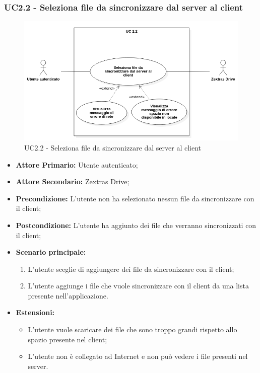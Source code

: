 \subsubsection{UC2.2 - Seleziona file da sincronizzare dal server al client}
\begin{figure}[H]
    \centering
    \includegraphics[scale = 0.6]{components/img/UC2_2.png}
    \caption{UC2.2 - Seleziona file da sincronizzare dal server al client}
\end{figure}
\begin{itemize}
\item \textbf{Attore Primario:} Utente autenticato;
\item \textbf{Attore Secondario:} Zextras Drive;
\item \textbf{Precondizione:} L'utente non ha selezionato nessun file da sincronizzare con il client;
\item \textbf{Postcondizione:} L'utente ha aggiunto dei file che verranno sincronizzati con il client;
\item \textbf{Scenario principale:}
    \begin{enumerate}
    \item L'utente sceglie di aggiungere dei file da sincronizzare con il client;
    \item L'utente aggiunge i file che vuole sincronizzare con il client da una lista presente nell'applicazione.
    \end{enumerate}
\item \textbf{Estensioni:}
    \begin{itemize}
    \item L'utente vuole scaricare dei file che sono troppo grandi rispetto allo spazio presente nel client;
    \item L'utente non è collegato ad Internet e non può vedere i file presenti nel server.
    \end{itemize}
\end{itemize}

